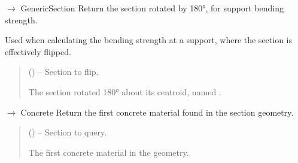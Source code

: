 \documentclass[a4paper,11pt,german]{sphinxmanual}
\begin{document}

\begin{fulllineitems}
\label{\detokenize{api/analysis_core:core.analysis_core.section_methods.flipped_section}}
\pysigstartsignatures
\pysiglinewithargsret
{}
{}
{{ $\rightarrow$ GenericSection}}
\pysigstopsignatures
\sphinxAtStartPar
Return the section rotated by 180°, for support bending strength.

\sphinxAtStartPar
Used when calculating the bending strength at a support, where the
section is effectively flipped.
\begin{quote}\begin{description}
\sphinxAtStartPar
{} () – Section to flip.

\sphinxAtStartPar
The section rotated 180° about its centroid, named
.

\sphinxAtStartPar
{}

\end{description}\end{quote}

\end{fulllineitems}


\begin{fulllineitems}
\label{\detokenize{api/analysis_core:core.analysis_core.section_methods.get_concrete}}
\pysigstartsignatures
\pysiglinewithargsret
{}
{}
{{ $\rightarrow$ Concrete}}
\pysigstopsignatures
\sphinxAtStartPar
Return the first concrete material found in the section geometry.
\begin{quote}\begin{description}
\sphinxAtStartPar
{} () – Section to query.

\sphinxAtStartPar
The first concrete material in the geometry.

\sphinxAtStartPar
{}

\end{description}\end{quote}

\end{fulllineitems}
\end{document}
